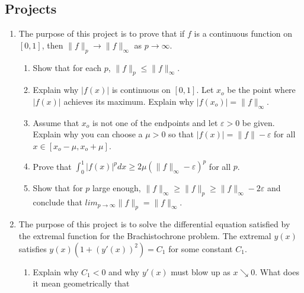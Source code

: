 \documentclass{article}
\begin{document}
\subsection*{Projects}
\begin{enumerate}
      \item The purpose of this project is to prove that if $f$ is a continuous
            function on $[0,1]$, then $\lVert f\rVert_p\to\lVert f\rVert_\infty$
            as $p\to \infty$.
            \begin{enumerate}
                  \item Show that for each $p$,
                        $\lVert f\rVert_p\leq\lVert f\rVert_\infty$.
                  \item Explain why $\lvert f(x)\rvert$ is continuous on
                        $[0,1]$. Let $x_o$ be the point where
                        $\lvert f(x)\rvert$ achieves its maximum. Explain why
                        $\lvert f(x_o)\rvert=\lVert f\rVert_\infty$.
                  \item Assume that $x_o$ is not one of the endpoints and let
                        $\varepsilon>0$ be given. Explain why you can choose
                        a $\mu>0$ so that
                        $\lvert f(x)\rvert=\lVert f\rVert - \varepsilon$ for all
                        $x\in[x_o-\mu,x_o+\mu]$.
                  \item Prove that $\int_0^1\lvert f(x)\rvert^pdx \geq
                              2\mu(\lVert f\rVert_\infty-\varepsilon)^p$ for
                        all $p$.
                  \item Show that for $p$ large enough, $\lVert f\rVert_\infty
                              \geq \lVert f\rVert_p \geq \lVert f\rVert_\infty
                              -2\varepsilon$ and conclude that $lim_{p\to\infty}
                              \lVert f\rVert_p = \lVert f\rVert_\infty$.
            \end{enumerate}
            \setcounter{enumi}{3}
      \item The purpose of this project is to solve the differential equation
            satisfied by the extremal function for the Brachistochrone problem.
            The extremal $y(x)$ satisfies $y(x)(1+(y'(x))^2)=C_1$ for some
            constant $C_1$.
            \begin{enumerate}
                  \item Explain why $C_1<0$ and why $y'(x)$ must blow up as
                        $x\searrow  0$. What does it mean geometrically that

\end{enumerate}
\end{enumerate}
\end{document}
